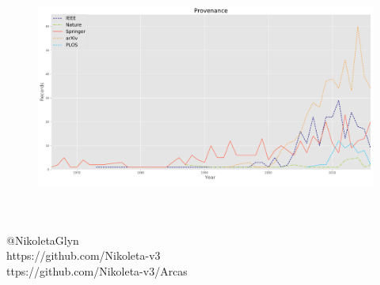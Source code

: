 \documentclass{beamer}
\theoremstyle{definition}
\begin{document}
\begin{frame}
\begin{center}
\begin{figure}[]
        \includegraphics[width=\textwidth]{static/provenance.pdf}
\end{figure}
\end{center}
\end{frame}

\begin{frame}
	\begin{center}
		\huge{\textbf{}}\\~\\
		\small{@NikoletaGlyn}\\
		\small{https://github.com/Nikoleta-v3}\\
		\small{ttps://github.com/Nikoleta-v3/Arcas}
	\end{center}
\end{frame}
\end{document}
